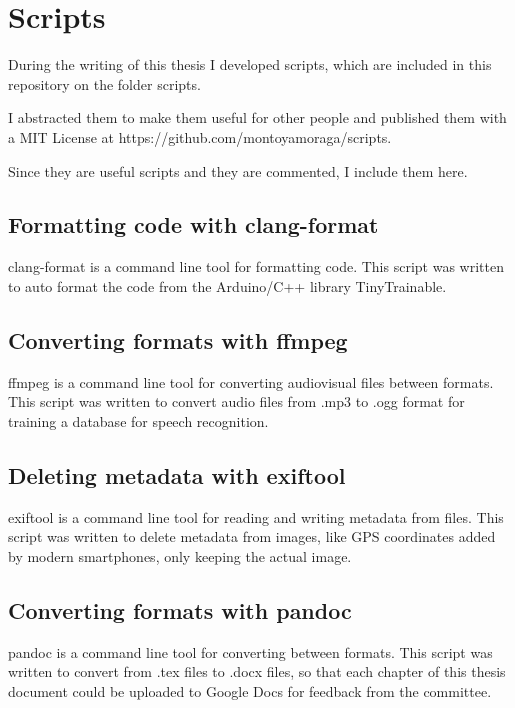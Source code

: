 \chapter{Scripts}

During the writing of this thesis I developed scripts, which are included in this repository on the folder scripts.

I abstracted them to make them useful for other people and published them with a MIT License at https://github.com/montoyamoraga/scripts.

Since they are useful scripts and they are commented, I include them here.

\section{Formatting code with clang-format}

clang-format is a command line tool for formatting code. This script was written to auto format the code from the Arduino/C++ library TinyTrainable.



\section{Converting formats with ffmpeg}

ffmpeg is a command line tool for converting audiovisual files between formats. This script was written to convert audio files from .mp3 to .ogg format for training a database for speech recognition.



\section{Deleting metadata with exiftool}

exiftool is a command line tool for reading and writing metadata from files. This script was written to delete metadata from images, like GPS coordinates added by modern smartphones, only keeping the actual image.



\section{Converting formats with pandoc}

pandoc is a command line tool for converting between formats. This script was written to convert from .tex files to .docx files, so that each chapter of this thesis document could be uploaded to Google Docs for feedback from the committee.


